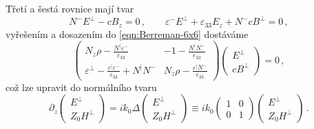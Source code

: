 Třetí a šestá rovnice mají tvar
\begin{equation}
    N^- E^\perp - cB_z=0 \,, \qquad \varepsilon^- E^\perp + \varepsilon_{33} E_z + N^- cB^\perp=0 \,,
\end{equation}
vyřešením a dosazením do \eqref{eqn:Berreman-6x6} dostáváme
\begin{equation}
    \begin{pmatrix}
        N_z \rho -\frac{N^\vert \varepsilon^-}{\varepsilon_{33}} & -1 - \frac{N^\vert N^- }{\varepsilon_{33}} \\
        \varepsilon^\perp-\frac{\varepsilon^\vert \varepsilon^-}{\varepsilon_{33}}+N^\vert N^- & N_z \rho - \frac{\varepsilon^\vert N^-}{\varepsilon_{33}}
    \end{pmatrix}
    \begin{pmatrix} E^\perp \\ cB^\perp \end{pmatrix} = 0 \,,
\end{equation}
což lze upravit do normálního tvaru
\begin{equation} 
\label{eqn:Berreman-master}
    \partial_z \begin{pmatrix} E^\perp \\ Z_0 H^\perp \end{pmatrix}
    = i k_0 \Delta \begin{pmatrix} E^\perp \\ Z_0 H^\perp \end{pmatrix}
    \equiv i k_0 \begin{pmatrix}
        1 & 0 \\ 0 & 1
    \end{pmatrix}
    \begin{pmatrix} E^\perp \\ Z_0 H^\perp \end{pmatrix} \,.
\end{equation}

